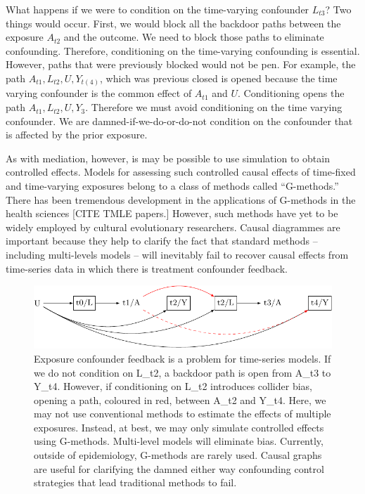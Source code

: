 \documentclass[
  singlecolumn]{report}
\begin{document}
What happens if we were to condition on the time-varying confounder
\(L_{t3}\)? Two things would occur. First, we would block all the
backdoor paths between the exposure \(A_{t2}\) and the outcome. We need
to block those paths to eliminate confounding. Therefore, conditioning
on the time-varying confounding is essential. However, paths that were
previously blocked would not be pen. For example, the path
\(A_{t1}, L_{t2}, U, Y_{t(4)}\), which was previous closed is opened
because the time varying confounder is the common effect of \(A_{t1}\)
and \(U\). Conditioning opens the path \(A_{t1}, L_{t2}, U, Y_{3}\).
Therefore we must avoid conditioning on the time varying confounder. We
are damned-if-we-do-or-do-not condition on the confounder that is
affected by the prior exposure.

As with mediation, however, is may be possible to use simulation to
obtain controlled effects. Models for assessing such controlled causal
effects of time-fixed and time-varying exposures belong to a class of
methods called ``G-methods.'' There has been tremendous development in
the applications of G-methods in the health sciences {[}CITE TMLE
papers.{]} However, such methods have yet to be widely employed by
cultural evolutionary researchers. Causal diagrammes are important
because they help to clarify the fact that standard methods -- including
multi-levels models -- will inevitably fail to recover causal effects
from time-series data in which there is treatment confounder feedback.

\begin{figure}

{\centering \includegraphics[width=1\textwidth,height=\textheight]{causal-dags_files/figure-pdf/fig-dag-9-1.pdf}

}

\caption{\label{fig-dag-9}Exposure confounder feedback is a problem for
time-series models. If we do not condition on L\_t2, a backdoor path is
open from A\_t3 to Y\_t4. However, if conditioning on L\_t2 introduces
collider bias, opening a path, coloured in red, between A\_t2 and Y\_t4.
Here, we may not use conventional methods to estimate the effects of
multiple exposures. Instead, at best, we may only simulate controlled
effects using G-methods. Multi-level models will eliminate bias.
Currently, outside of epidemiology, G-methods are rarely used. Causal
graphs are useful for clarifying the damned either way confounding
control strategies that lead traditional methods to fail.}

\end{figure}
\end{document}
